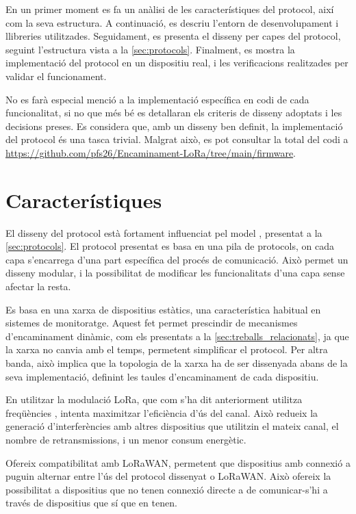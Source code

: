 \documentclass{tfgitic}[2024/07/01]
\begin{document}
En un primer moment es fa un anàlisi de les característiques del protocol, així com la seva estructura. A continuació, es descriu l'entorn de desenvolupament i llibreries utilitzades. Seguidament, es presenta el disseny per capes del protocol, seguint l'estructura vista a la \autoref{sec:protocols}. Finalment, es mostra la implementació del protocol en un dispositiu real, i les verificacions realitzades per validar el funcionament.

No es farà especial menció a la implementació específica en codi de cada funcionalitat, si no que més bé es detallaran els criteris de disseny adoptats i les decisions preses. Es considera que, amb un disseny ben definit, la implementació del protocol és una tasca trivial. Malgrat això, es pot consultar la total del codi a \url{https://github.com/pfs26/Encaminament-LoRa/tree/main/firmware}.

\section{Característiques}
El disseny del protocol està fortament influenciat pel model , presentat a la \autoref{sec:protocols}. El protocol presentat es basa en una pila de protocols, on cada capa s'encarrega d'una part específica del procés de comunicació. Això permet un disseny modular, i la possibilitat de modificar les funcionalitats d'una capa sense afectar la resta.

Es basa en una xarxa de dispositius estàtics, una característica habitual en sistemes de monitoratge. Aquest fet permet prescindir de mecanismes d'encaminament dinàmic, com els presentats a la \autoref{sec:treballs_relacionats}, ja que la xarxa no canvia amb el temps, permetent simplificar el protocol. Per altra banda, això implica que la topologia de la xarxa ha de ser dissenyada abans de la seva implementació, definint les taules d'encaminament de cada dispositiu.

En utilitzar la modulació LoRa, que com s'ha dit anteriorment utilitza freqüències , intenta maximitzar l'eficiència d'ús del canal. Això redueix la generació d'interferències amb altres dispositius que utilitzin el mateix canal, el nombre de retransmissions, i un menor consum energètic.

Ofereix compatibilitat amb LoRaWAN, permetent que dispositius amb connexió a  puguin alternar entre l'ús del protocol dissenyat o LoRaWAN. Això ofereix la possibilitat a dispositius que no tenen connexió directe a  de comunicar-s'hi a través de dispositius que sí que en tenen. 
\end{document}
